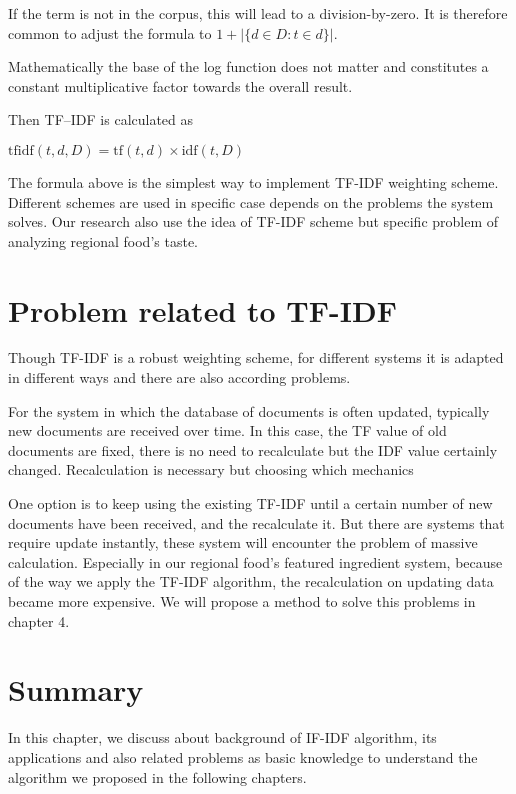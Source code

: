If the term is not in the corpus, this will lead to a division-by-zero. It is therefore common to adjust the formula to $1 + |\{d \in D: t \in d\}|$.

Mathematically the base of the log function does not matter and constitutes a constant multiplicative factor towards the overall result.

Then TF–IDF is calculated as
\begin{center}
\smallskip
$\mathrm{tfidf}(t,d,D) = \mathrm{tf}(t,d) \times \mathrm{idf}(t, D)$ 
\smallskip
\end{center}

The formula above is the simplest way to implement TF-IDF weighting scheme. Different schemes are used in specific case depends on the problems the system solves. Our research also use the idea of TF-IDF scheme but specific problem of analyzing regional food's taste.  


\section{Problem related to TF-IDF}\label{sec:bg_prob}

Though TF-IDF is a robust weighting scheme, for different systems it is adapted in different ways and there are also according problems. 

For the system in which the database of documents is often updated, typically new documents are received over time. In this case, the TF value of old documents are fixed, there is no need to recalculate but the IDF value certainly changed. Recalculation is necessary but choosing which mechanics 

One option is to keep using the existing TF-IDF until a certain number of new documents have been received, and the recalculate it. But there are systems that require update instantly, these system will encounter the problem of massive calculation. Especially in our regional food's featured ingredient system, because of the way we apply the TF-IDF algorithm, the recalculation on updating data became more expensive. We will propose a method to solve this problems in chapter 4.     


\section{Summary}\label{sec:bg_sm}

In this chapter, we discuss about background of IF-IDF algorithm, its applications and also related problems as basic knowledge to understand the algorithm we proposed in the following chapters. 